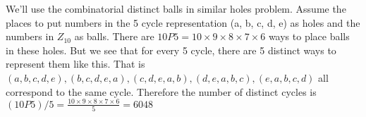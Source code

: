 \documentclass[12pt]{exam}
\theoremstyle{plain} %
\theoremstyle{definition} %
\theoremstyle{remark} %
\begin{document}
\begin{questions}
  \question
  \begin{solution}
  \end{solution}

  \question
  \begin{solution}
    We'll use the combinatorial distinct balls in similar holes problem. Assume the places to put numbers in the 5 cycle representation (a, b, c, d, e) as holes and the numbers in $Z_{10}$ as balls. There are $10P5 = 10\times 9 \times 8 \times 7 \times 6$ ways to place balls in these holes. But we see that for every 5 cycle, there are 5 distinct ways to represent them like this. That is $(a, b, c, d, e), ( b, c, d, e, a), ( c, d, e, a, b), (d, e, a, b, c), (e, a, b, c, d)$ all correspond to the same cycle. Therefore the number of distinct  cycles is $(10P5)/5 = \frac{10\times9\times8\times7\times6}{5} = 6048$
  \end{solution}

  \question
  \begin{solution}
\end{solution}
\end{questions}
\end{document}

